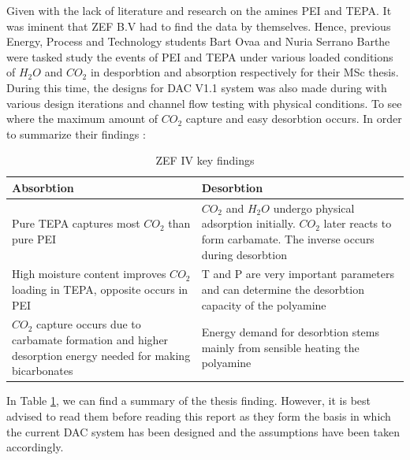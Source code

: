 Given with the lack of literature and research on the amines PEI and TEPA. It was iminent that ZEF B.V had to find the data by themselves. Hence, previous Energy, Process and Technology students Bart Ovaa and Nuria Serrano Barthe were tasked study the events of PEI and TEPA under various loaded conditions of $H_{2}O$ and $CO_2$ in desporbtion \cite{Ovaa2019} and absorption \cite{NuriaSerranoBarthe2019} respectively for their MSc thesis. During this time, the designs for DAC V1.1 system was also made during with various design iterations and channel flow testing with physical conditions. To see where the maximum amount of $CO_2$ capture and easy desorbtion occurs. In order to summarize their findings : 

\begin{table}[H]
    \centering
    \begin{tabular}{|p{}|p{}|}
    \hline
        Absorbtion \cite{NuriaSerranoBarthe2019}  &  Desorbtion  \cite{Ovaa2019} \\
         \hline
         \hline
        Pure TEPA captures most $CO_2$ than pure PEI    &  $CO_2$ and $H_{2}O$ undergo physical adsorption initially. $CO_2$ later reacts to form carbamate. The inverse occurs during desorbtion  \\
        \hline
        High moisture content improves $CO_2$ loading in TEPA, opposite occurs in PEI   &    T and P are very important parameters and can determine the desorbtion capacity of the polyamine  \\
        \hline
        $CO_2$ capture occurs due to carbamate formation and higher desorption energy needed for making bicarbonates    &  Energy demand for desorbtion stems mainly from sensible heating the polyamine \\
        \hline
        
        
    \end{tabular}
    \caption{ZEF IV key findings \cite{NuriaSerranoBarthe2019} \cite{Ovaa2019}}
    \label{tab:ZEF4find}
\end{table}


In Table \ref{tab:ZEF4find}, we can find a summary of the thesis finding. However, it is best advised to read them before reading this report as they form the basis in which the current DAC system has been designed and the assumptions have been taken accordingly. 
















